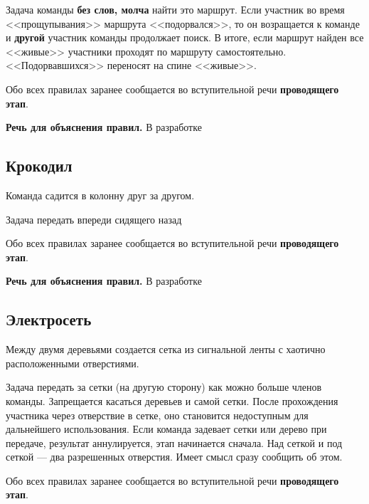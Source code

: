 \documentclass[a4paper, 14pt]{extarticle}
\theoremstyle{definition}
\begin{document}
\par Задача команды \textbf{без слов, молча} найти это маршрут. Если участник во время <<прощупывания>> маршрута <<подорвался>>, то он возращается к команде и \textbf{другой} участник команды продолжает поиск. В итоге, если маршрут найден все <<живые>> участники проходят по маршруту самостоятельно. <<Подорвавшихся>> переносят на спине <<живые>>.

\par Обо всех правилах заранее сообщается во вступительной речи \textbf{проводящего этап}.

\par \textbf{Речь для объяснения правил.} В разработке


\subsection{Крокодил}

\par Команда садится в колонну друг за другом.

\par Задача передать впереди сидящего назад

\par Обо всех правилах заранее сообщается во вступительной речи \textbf{проводящего этап}.

\par \textbf{Речь для объяснения правил.} В разработке


\subsection{Электросеть}

\par Между двумя деревьями создается сетка из сигнальной ленты с хаотично расположенными отверстиями.

\par Задача передать за сетки (на другую сторону) как можно больше членов команды. Запрещается касаться деревьев и самой сетки. После прохождения участника через отверствие в сетке, оно становится недоступным для дальнейшего использования. Если команда задевает сетки или дерево при передаче, результат аннулируется, этап начинается сначала. Над сеткой и под сеткой --- два разрешенных отверстия. Имеет смысл сразу сообщить об этом.

\par Обо всех правилах заранее сообщается во вступительной речи \textbf{проводящего этап}.
\end{document}
